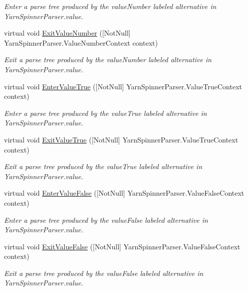 \begin{DoxyCompactItemize}
\begin{DoxyCompactList}\small\item\em Enter a parse tree produced by the {\ttfamily value\-Number} labeled alternative in Yarn\-Spinner\-Parser.\-value. \end{DoxyCompactList}\item 
virtual void \hyperlink{a00196_aca49c7a82494d35e3c0035dc2d7f5b02}{Exit\-Value\-Number} (\mbox{[}Not\-Null\mbox{]} Yarn\-Spinner\-Parser.\-Value\-Number\-Context context)
\begin{DoxyCompactList}\small\item\em Exit a parse tree produced by the {\ttfamily value\-Number} labeled alternative in Yarn\-Spinner\-Parser.\-value. \end{DoxyCompactList}\item 
virtual void \hyperlink{a00196_a37726e9d5de13df5a1ff987bca4cbd50}{Enter\-Value\-True} (\mbox{[}Not\-Null\mbox{]} Yarn\-Spinner\-Parser.\-Value\-True\-Context context)
\begin{DoxyCompactList}\small\item\em Enter a parse tree produced by the {\ttfamily value\-True} labeled alternative in Yarn\-Spinner\-Parser.\-value. \end{DoxyCompactList}\item 
virtual void \hyperlink{a00196_aa93e3f3a8f522d20d559f2b66bf780ce}{Exit\-Value\-True} (\mbox{[}Not\-Null\mbox{]} Yarn\-Spinner\-Parser.\-Value\-True\-Context context)
\begin{DoxyCompactList}\small\item\em Exit a parse tree produced by the {\ttfamily value\-True} labeled alternative in Yarn\-Spinner\-Parser.\-value. \end{DoxyCompactList}\item 
virtual void \hyperlink{a00196_ac84fd7ce4eec5de621fb041b1a863014}{Enter\-Value\-False} (\mbox{[}Not\-Null\mbox{]} Yarn\-Spinner\-Parser.\-Value\-False\-Context context)
\begin{DoxyCompactList}\small\item\em Enter a parse tree produced by the {\ttfamily value\-False} labeled alternative in Yarn\-Spinner\-Parser.\-value. \end{DoxyCompactList}\item 
virtual void \hyperlink{a00196_abb1e92cab5c21a27d277f4f77b50b42a}{Exit\-Value\-False} (\mbox{[}Not\-Null\mbox{]} Yarn\-Spinner\-Parser.\-Value\-False\-Context context)
\begin{DoxyCompactList}\small\item\em Exit a parse tree produced by the {\ttfamily value\-False} labeled alternative in Yarn\-Spinner\-Parser.\-value. \end{DoxyCompactList}\item 

\end{DoxyCompactItemize}
